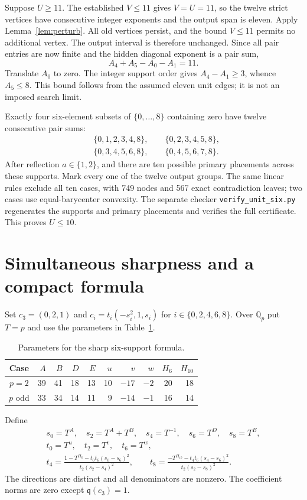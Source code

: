 \documentclass[11pt]{article}
\theoremstyle{remark}\newtheorem{remark}[theorem]{Remark}
\newcommand{\qf}{\mathfrak q}
\newcommand{\Q}{\mathbb Q}
\begin{document}
Suppose $U\ge11$. The established $V\le11$ gives $V=U=11$, so the
twelve strict vertices have consecutive integer exponents and the
output span is eleven. Apply Lemma~\ref{lem:perturb}. All old vertices
persist, and the bound $V\le11$ permits no additional vertex. The
output interval is therefore unchanged. Since all pair entries are
now finite and the hidden diagonal exponent is a pair sum,
\[
 A_4+A_5-A_0-A_1=11.
\]
Translate $A_0$ to zero. The integer support order gives
$A_4-A_1\ge3$, whence $A_5\le8$. This bound follows from the
assumed eleven unit edges; it is not an imposed search limit.

Exactly four six-element subsets of $\{0,\ldots,8\}$ containing zero
have twelve consecutive pair sums:
\[
 \begin{split}
 &\{0,1,2,3,4,8\},\qquad\{0,2,3,4,5,8\},\\
 &\{0,3,4,5,6,8\},\qquad\{0,4,5,6,7,8\}.
 \end{split}
\]
After reflection $a\in\{1,2\}$, and there are ten possible primary
placements across these supports. Mark every one of the twelve output
groups. The same linear rules exclude all ten cases, with 749 nodes
and 567 exact contradiction leaves; two cases use equal-barycenter
convexity. The separate checker \texttt{verify\_unit\_six.py} regenerates
the supports and primary placements and verifies the full certificate.
This proves $U\le10$.

\section{Simultaneous sharpness and a compact formula}\label{sec:sharpness}

Set $c_3=(0,2,1)$ and $c_i=t_i(-s_i^2,1,s_i)$ for
$i\in\{0,2,4,6,8\}$. Over $\Q_p$ put $T=p$ and use the parameters
in Table~\ref{tab:parameters}.
\begin{table}[ht]
\centering
\begin{tabular}{crrrrrrrrr}
\toprule
Case&$A$&$B$&$D$&$E$&$u$&$v$&$w$&$H_6$&$H_{10}$\\
\midrule
$p=2$&39&41&18&13&10&$-17$&$-2$&20&18\\
$p$ odd&33&34&14&11&9&$-14$&$-1$&16&14\\
\bottomrule
\end{tabular}
\caption{Parameters for the sharp six-support formula.}\label{tab:parameters}
\end{table}
Define
\begin{gather*}
 s_0=T^A,\quad s_2=T^A+T^B,\quad s_4=T^{-1},\quad
 s_6=T^D,\quad s_8=T^E,\\
 t_0=T^u,\quad t_2=T^v,\quad t_6=T^w,\\
 t_4=\frac{1-T^{H_6}-t_0t_6(s_0-s_6)^2}{t_2(s_2-s_4)^2},\qquad
 t_8=\frac{-T^{H_{10}}-t_4t_6(s_4-s_6)^2}{t_2(s_2-s_8)^2}.
\end{gather*}
The directions are distinct and all denominators are nonzero.
The coefficient norms are zero except $\qf(c_3)=1$.
\end{document}
